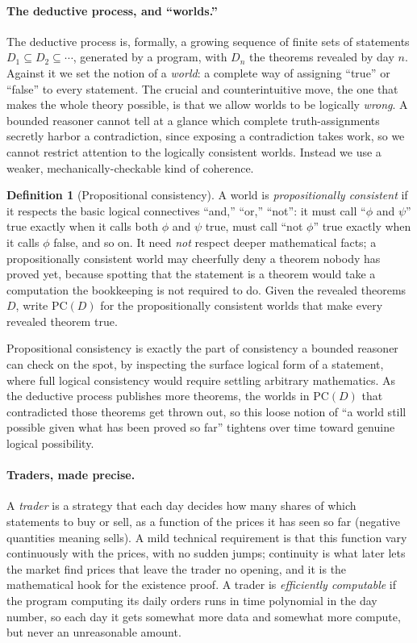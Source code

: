 \documentclass[10pt]{article}
\theoremstyle{definition}
\newtheorem{definition}[theorem]{Definition}
\theoremstyle{remark}
\newcommand{\PC}{\mathrm{PC}}
\begin{document}
\paragraph{The deductive process, and ``worlds.''} The deductive process is, formally, a growing sequence of finite sets of statements $D_1 \subseteq D_2 \subseteq \cdots$, generated by a program, with $D_n$ the theorems revealed by day $n$. Against it we set the notion of a \emph{world}: a complete way of assigning ``true'' or ``false'' to every statement. The crucial and counterintuitive move, the one that makes the whole theory possible, is that we allow worlds to be logically \emph{wrong}. A bounded reasoner cannot tell at a glance which complete truth-assignments secretly harbor a contradiction, since exposing a contradiction takes work, so we cannot restrict attention to the logically consistent worlds. Instead we use a weaker, mechanically-checkable kind of coherence.

\begin{definition}[Propositional consistency]
\label{def:pc}
A world is \emph{propositionally consistent} if it respects the basic logical connectives ``and,'' ``or,'' ``not'': it must call ``$\phi$ and $\psi$'' true exactly when it calls both $\phi$ and $\psi$ true, must call ``not $\phi$'' true exactly when it calls $\phi$ false, and so on. It need \emph{not} respect deeper mathematical facts; a propositionally consistent world may cheerfully deny a theorem nobody has proved yet, because spotting that the statement is a theorem would take a computation the bookkeeping is not required to do. Given the revealed theorems $D$, write $\PC(D)$ for the propositionally consistent worlds that make every revealed theorem true.
\end{definition}

Propositional consistency is exactly the part of consistency a bounded reasoner can check on the spot, by inspecting the surface logical form of a statement, where full logical consistency would require settling arbitrary mathematics. As the deductive process publishes more theorems, the worlds in $\PC(D)$ that contradicted those theorems get thrown out, so this loose notion of ``a world still possible given what has been proved so far'' tightens over time toward genuine logical possibility.

\paragraph{Traders, made precise.} A \emph{trader} is a strategy that each day decides how many shares of which statements to buy or sell, as a function of the prices it has seen so far (negative quantities meaning sells). A mild technical requirement is that this function vary continuously with the prices, with no sudden jumps; continuity is what later lets the market find prices that leave the trader no opening, and it is the mathematical hook for the existence proof. A trader is \emph{efficiently computable} if the program computing its daily orders runs in time polynomial in the day number, so each day it gets somewhat more data and somewhat more compute, but never an unreasonable amount.
\end{document}
